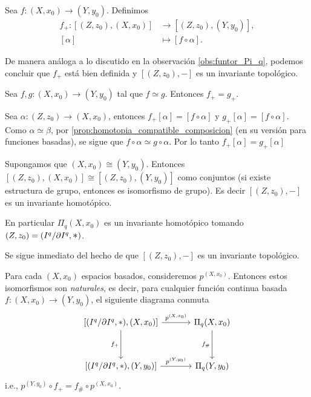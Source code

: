 \begin{definicion}
\label{def:morfismo_f_+}
    Sea $f:(X,x_0)\to(Y,y_0)$. Definimos
    \begin{align*}
        f_+:[(Z,z_0),(X,x_0)]&\to[(Z,z_0),(Y,y_0)],\\
            [\alpha]&\mapsto [f\circ \alpha].
    \end{align*}
\end{definicion}
De manera análoga a lo discutido en la observación \ref{obs:funtor_Pi_q}, podemos concluir que $f_+$ está bien definida y $[(Z,z_0),-]$ es un invariante topológico.
\begin{prop}
    Sea $f,g:(X,x_0)\to (Y,y_0)$ tal que $f\simeq g$. Entonces $f_+=g_+$.
\end{prop}
\begin{dem}
    Sea $\alpha:(Z,z_0)\to(X,x_0)$, entonces $f_+[\alpha]=[f\circ \alpha]$ y $g_+[\alpha]=[f\circ \alpha]$. Como $\alpha\simeq\beta$, por \ref{prop:homotopia_compatible_composicion} (en su versión para funciones basadas), se sigue que $f\circ \alpha\simeq g\circ \alpha$. Por lo tanto $f_+[\alpha]=g_+[\alpha]$
\end{dem}
\begin{coro}
    Supongamos que $(X,x_0)\cong(Y,y_0)$. Entonces $[(Z,z_0),(X,x_0)]\cong [(Z,z_0),(Y,y_0)]$ como conjuntos (si existe estructura de grupo, entonces es isomorfismo de grupo). Es decir $[(Z,z_0),-]$ es un invariante homotópico. 
    
    En particular $\Pi_q(X,x_0)$ es un invariante homotópico tomando $(Z,z_0)=(\Iq/\pIq,\bigast)$.
\end{coro}
\begin{dem}
    Se sigue inmediato del hecho de que $[(Z,z_0),-]$ es un invariante topológico.
\end{dem}
\begin{prop}
\label{prop:p_transformacion_natural}
    Para cada $(X,x_0)$ espacios basados, consideremos $p^{(X,x_0)}$. Entonces estos isomorfismos son \textit{naturales}, es decir, para cualquier función continua basada $f:(X,x_0)\to (Y,y_0)$, el siguiente diagrama conmuta
    \[
    \begin{tikzcd}[column sep=1.2cm, row sep=1.2cm] 
        \bIq\arrow[r,"\px"] \arrow[d,"f_+"'] & \Pi_q(X,x_0) \arrow[d,"f_\#"']\\
        \YIq\arrow[r,"\py"] & \Pi_q(Y,y_0)
\end{tikzcd}
    \]
    i.e., $p^{(Y,y_0)}\circ f_+=f_\#\circ p^{(X,x_0)}.$
\end{prop}
